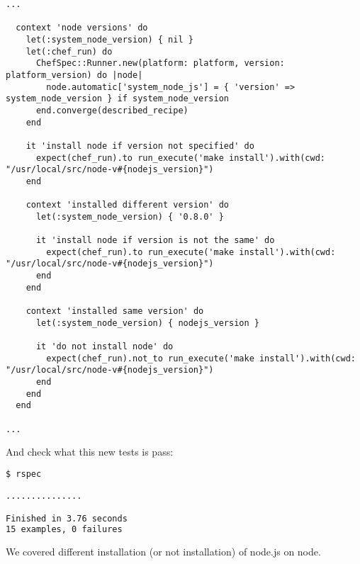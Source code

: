 \begin{lstlisting}[label=lst:testing-fauxhai2,title=my-server-cloud/site-cookbooks/my\_cool\_app/spec/unit/recipes/node\_spec.rb]
...

  context 'node versions' do
    let(:system_node_version) { nil }
    let(:chef_run) do
      ChefSpec::Runner.new(platform: platform, version: platform_version) do |node|
        node.automatic['system_node_js'] = { 'version' => system_node_version } if system_node_version
      end.converge(described_recipe)
    end

    it 'install node if version not specified' do
      expect(chef_run).to run_execute('make install').with(cwd: "/usr/local/src/node-v#{nodejs_version}")
    end

    context 'installed different version' do
      let(:system_node_version) { '0.8.0' }

      it 'install node if version is not the same' do
        expect(chef_run).to run_execute('make install').with(cwd: "/usr/local/src/node-v#{nodejs_version}")
      end
    end

    context 'installed same version' do
      let(:system_node_version) { nodejs_version }

      it 'do not install node' do
        expect(chef_run).not_to run_execute('make install').with(cwd: "/usr/local/src/node-v#{nodejs_version}")
      end
    end
  end

...
\end{lstlisting}

And check what this new tests is pass:

\begin{lstlisting}[language=Bash,label=lst:testing-fauxhai3]
$ rspec

...............

Finished in 3.76 seconds
15 examples, 0 failures
\end{lstlisting}

We covered different installation (or not installation) of node.js on node.
